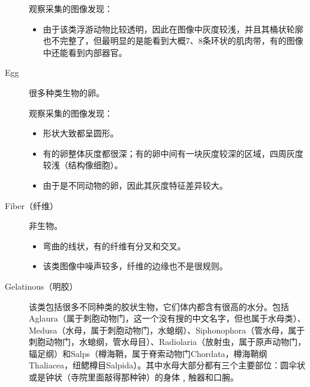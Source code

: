 \begin{description}
    观察采集的图像发现：
        \begin{itemize}
        \item 由于该类浮游动物比较透明，因此在图像中灰度较浅，并且其桶状轮廓也不完整了，但最明显的是能看到大概7、8条环状的肌肉带，有的图像中还能看到内部器官。
        \end{itemize}
    \item[{\color{blue}Egg}] 很多种类生物的卵。
    
    观察采集的图像发现：
        \begin{itemize}
        \item 形状大致都呈圆形。
        \item 有的卵整体灰度都很深；有的卵中间有一块灰度较深的区域，四周灰度较浅（结构像细胞）。
        \item {\color{blue}由于是不同动物的卵，因此其灰度特征差异较大}。
        \end{itemize}
    \item[Fiber（纤维）] 非生物。
        \begin{itemize}
        \item 弯曲的线状，有的纤维有分叉和交叉。
        \item 该类图像中噪声较多，纤维的边缘也不是很规则。
        \end{itemize}
    \item[Gelatinous（明胶）] 该类包括很多不同种类的胶状生物，它们体内都含有很高的水分。包括Aglaura（属于刺胞动物门，这一个没有搜的中文名字，但也属于水母类）、Medusa（水母，属于刺胞动物门，水螅纲）、Siphonophora（管水母，属于刺胞动物门，水螅纲，管水母目）、Radiolaria（放射虫，属于原声动物门，辐足纲）和Salps（樽海鞘，属于脊索动物门Chordata，樽海鞘纲Thaliacea，纽鳃樽目Salpida）。其中水母大部分都有三个主要部位：圆伞状或是钟状（寺院里面敲得那种钟）的身体﹐触器和口腕。
    

\end{description}
